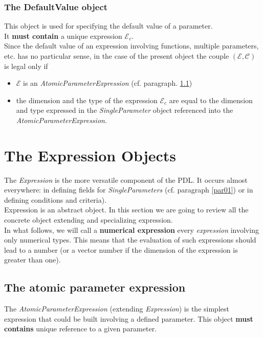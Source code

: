 \documentclass[a4paper,11pt] {article}
\begin{document}
\subsubsection{The DefaultValue object}
This object is used for specifying the default value of a parameter.\\
It {\bf must contain} a unique expression $\mathcal E_c$.\\
Since the default value of an expression involving functions, multiple parameters, etc. has no particular sense, in the case of the present object the couple $(\mathcal E, \mathcal C)$  is legal only if 
\begin{itemize}
\item $\mathcal E$ is an {\it AtomicParameterExpression} (cf. paragraph. \ref{par02_01})
\item the dimension and the type of the expression $\mathcal E_c$ are equal to the dimension and type expressed in the {\it SingleParameter} object referenced into the {\it AtomicParameterExpression}.
\end{itemize}

\section{The Expression Objects}\label{par02}
The {\it Expression} is the more versatile component of the PDL. It occurs almost everywhere: in defining fields for {\it SingleParameters} (cf. paragraph \ref{par01}) or in defining conditions and criteria).\\
Expression is an abstract object. In this section we are going to review all the concrete object extending and specializing expression.\\

 In what follows, we will call a {\bf numerical expression} every {\it expression} involving only numerical types. This means that the evaluation of such expressions should lead to a number (or a vector number if the dimension of the expression is greater than one).\\


\subsection{The atomic parameter expression}\label{par02_01}
The {\it AtomicParameterExpression} (extending {\it Expression}) is the simplest expression that could be built involving a defined parameter. This object {\bf must contains} unique reference to a given parameter.\\
\end{document}
